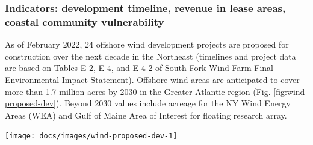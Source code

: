 \documentclass[
  10pt,
]{article}
\let\origfigure\figure
\let\endorigfigure\endfigure
\renewenvironment{figure}[1][2] {
    \expandafter\origfigure\expandafter[H]
} {
    \endorigfigure
}
\begin{document}
\hypertarget{indicators-development-timeline-revenue-in-lease-areas-coastal-community-vulnerability}{%
\subsubsection{Indicators: development timeline, revenue in lease areas,
coastal community
vulnerability}\label{indicators-development-timeline-revenue-in-lease-areas-coastal-community-vulnerability}}

As of February 2022, 24 offshore wind development projects are proposed
for construction over the next decade in the Northeast (timelines and
project data are based on Tables E-2, E-4, and E-4-2 of South Fork Wind
Farm Final Environmental Impact Statement). Offshore wind areas are
anticipated to cover more than 1.7 million acres by 2030 in the Greater
Atlantic region (Fig. \ref{fig:wind-proposed-dev}). Beyond 2030 values
include acreage for the NY Wind Energy Areas (WEA) and Gulf of Maine
Area of Interest for floating research array.

\begin{figure}

{\centering \texttt{[image: docs/images/wind-proposed-dev-1]} 

}

\caption{Proposed wind development on the northeast shelf.}\label{fig:wind-proposed-dev}
\end{figure}
\end{document}
